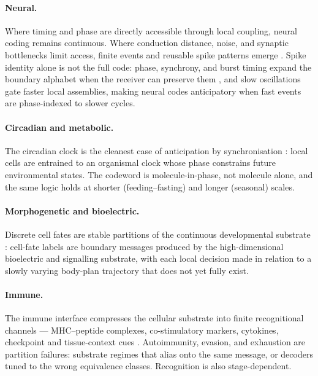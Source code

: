 \documentclass[12pt]{article}
\theoremstyle{definition}
\begin{document}
\paragraph{Neural.} Where timing and phase are directly accessible through local coupling, neural coding remains continuous. Where conduction distance, noise, and synaptic bottlenecks limit access, finite events and reusable spike patterns emerge \citep{buzsaki2004,fries2015,panzeri2010}. Spike identity alone is not the full code: phase, synchrony, and burst timing expand the boundary alphabet when the receiver can preserve them \citep{fries2005,canolty2010,lundqvist2016,miller2018working,sterling2015}, and slow oscillations gate faster local assemblies, making neural codes anticipatory when fast events are phase-indexed to slower cycles.

\paragraph{Circadian and metabolic.} The circadian clock is the cleanest case of anticipation by synchronisation \citep{winfree2001,forger2017,pittendrigh1993,lowrey2004}: local cells are entrained to an organismal clock whose phase constrains future environmental states. The codeword is molecule-in-phase, not molecule alone, and the same logic holds at shorter (feeding--fasting) and longer (seasonal) scales.

\paragraph{Morphogenetic and bioelectric.} Discrete cell fates are stable partitions of the continuous developmental substrate \citep{pezzulo2016,levin2023,levin2025multiscale,hansali2025}: cell-fate labels are boundary messages produced by the high-dimensional bioelectric and signalling substrate, with each local decision made in relation to a slowly varying body-plan trajectory that does not yet fully exist.

\paragraph{Immune.} The immune interface compresses the cellular substrate into finite recognitional channels --- MHC--peptide complexes, co-stimulatory markers, cytokines, checkpoint and tissue-context cues \citep{janeway2001,davis1998}. Autoimmunity, evasion, and exhaustion are partition failures: substrate regimes that alias onto the same message, or decoders tuned to the wrong equivalence classes. Recognition is also stage-dependent.
\end{document}
